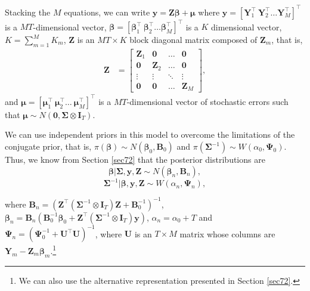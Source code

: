 Stacking the $M$ equations, we can write $\bm{y}=\bm{Z}\bm{\beta}+\bm{\mu}$ where $\bm{y}=\left[\bm{Y}_{1}^{\top} \ \bm{Y}_{2}^{\top} \dots \bm{Y}_{M}^{\top}\right]^{\top}$ is a $MT$-dimensional vector,  $\bm{\beta}=\left[\bm{\beta}_{1}^{\top} \ \bm{\beta}_{2}^{\top} \ldots \bm{\beta}_{M}^{\top}\right]^{\top}$ is a $ K$ dimensional vector, $K=\sum_{m=1}^{M} K_m$, $\bm{Z}$ is an $MT\times K$ block diagonal matrix composed of $\bm{Z}_{m}$, that is,
\begin{align*}
	\bm{Z}&=\begin{bmatrix}
		\bm{Z}_1 & \bm{0} & \dots & \bm{0}\\
		\bm{0} & \bm{Z}_2 & \dots & \bm{0}\\
		\vdots & \vdots & \ddots & \vdots\\
		\bm{0} & \bm{0} & \dots & \bm{Z}_M		
	\end{bmatrix},
\end{align*}
and $\bm{\mu}=\left[\bm{\mu}_{1}^{\top} \ \bm{\mu}_{2}^{\top} \dots \ \bm{\mu}_{M}^{\top}\right]^{\top}$ is a $MT$-dimensional vector of stochastic errors such that $\bm{\mu}\sim{N}(\bm{0},\bm{\Sigma}\otimes \bm{I}_T)$.

We can use independent priors in this model to overcome the limitations of the conjugate prior, that is, $\pi(\bm{\beta})\sim{N}(\bm{\beta}_0,\bm{B}_0)$ and $\pi(\bm{\Sigma}^{-1})\sim{W}(\alpha_0,\bm{\Psi}_0)$. Thus, we know from Section \ref{sec72} that the posterior distributions are
\begin{equation*}
	\bm{\beta}|\bm{\Sigma}, \bm{y}, \bm{Z} \sim {N}(\bm{\beta}_n, \bm{B}_n), 
\end{equation*}
\begin{equation*}
	\bm{\Sigma}^{-1}|\bm{\beta}, \bm{y}, \bm{Z} \sim {W}(\alpha_n, \bm{\Psi}_n),
\end{equation*}

where $\bm{B}_n=(\bm{Z}^{\top}(\bm{\Sigma}^{-1}\otimes \bm{I}_T )\bm{Z}+\bm{B}_0^{-1})^{-1}$, $\bm{\beta}_n=\bm{B}_n(\bm{B}_0^{-1}\bm{\beta}_0 + \bm{Z}^{\top}(\bm{\Sigma}^{-1}\otimes \bm{I}_T)\bm{y})$, $\alpha_n = \alpha_0 + T$ and $\bm{\Psi}_n = (\bm{\Psi}_0^{-1} + \bm{U}^{\top}\bm{U})^{-1}$, where $\bm{U}$ is an $T\times M$ matrix whose columns are $\bm{Y}_m-\bm{Z}_m\bm{\beta}_m$.\footnote{We can also use the alternative representation presented in Section \ref{sec72}.}

